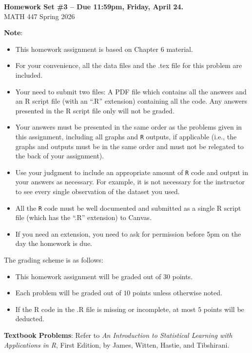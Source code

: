 \documentclass[12pt]{article}
\begin{document}
\newcommand{\bm}[1]{\mbox{\boldmath$#1$}}

\begin{center}{\bf Homework Set \#3 -- Due 11:59pm, Friday, April 24.} \\ {\sc MATH 447 Spring 2026}\end{center}
\textbf{Note}: 
\begin{itemize}
\item This homework assignment is based on Chapter 6 material. 
\item For your convenience, all the data files and the .tex file for this problem are included.
\item Your need to submit two files: A PDF file which contains all the answers and an R script file (with an ``.R'' extension) containing all the code.  Any answers presented in the R script file only will not be graded.
\item Your answers must be presented in the same order as the problems given in this assignment, including all graphs and {\tt R} outputs, if applicable (i.e., the graphs and outputs must be in the same order and must not be relegated to the back of your assignment). 
\item Use your judgment to include an appropriate amount of {\tt R} code and output in your answers as necessary. For example, it is not necessary for the instructor to see every single observation of the dataset you used.
\item All the {\tt R} code must be well documented and submitted as a single R script file (which has the ``.R'' extension) to Canvas. 
\item If you need an extension, you need to ask for permission before 5pm on the day the homework is due.
\end{itemize}

The grading scheme is as follows:
\begin{itemize}
\item This homework assignment will be graded out of $30$ points.
\item Each problem will be graded out of $10$ points unless otherwise noted.
\item If the R code in the .R file is missing or incomplete, at most $5$ points will be deducted.
\end{itemize}

\textbf{Textbook Problems}: Refer to \textit{An Introduction to Statistical Learning with Applications in R}, First Edition, by James, Witten, Hastie, and Tibshirani.
\end{document}
